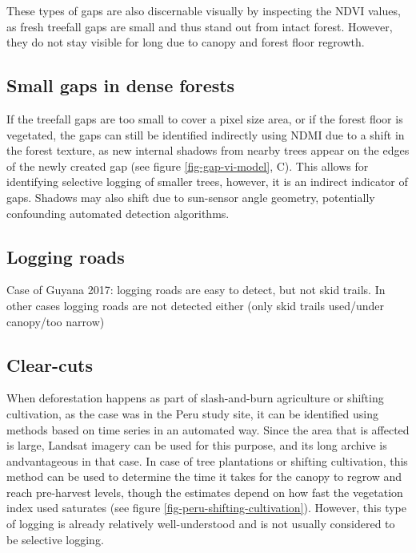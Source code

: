 \documentclass[a4paper,12pt]{scrbook}
\begin{document}
These types of gaps are also discernable visually by inspecting the \ac{NDVI} values, as fresh treefall gaps are small and thus stand out from intact forest. However, they do not stay visible for long due to canopy and forest floor regrowth.

\subsection{Small gaps in dense forests}


If the treefall gaps are too small to cover a pixel size area, or if the forest floor is vegetated, the gaps can still be identified indirectly using \ac{NDMI} due to a shift in the forest texture, as new internal shadows from nearby trees appear on the edges of the newly created gap (see figure \ref{fig-gap-vi-model}, C). This allows for identifying selective logging of smaller trees, however, it is an indirect indicator of gaps. Shadows may also shift due to sun-sensor angle geometry, potentially confounding automated detection algorithms.

\subsection{Logging roads}

Case of Guyana 2017: logging roads are easy to detect, but not skid trails. In other cases logging roads are not detected either (only skid trails used/under canopy/too narrow)

\subsection{Clear-cuts}


When deforestation happens as part of slash-and-burn agriculture or shifting cultivation, as the case was in the Peru study site, it can be identified using methods based on time series in an automated way. Since the area that is affected is large, Landsat imagery can be used for this purpose, and its long archive is andvantageous in that case. In case of tree plantations or shifting cultivation, this method can be used to determine the time it takes for the canopy to regrow and reach pre-harvest levels, though the estimates depend on how fast the vegetation index used saturates (see figure \ref{fig-peru-shifting-cultivation}). However, this type of logging is already relatively well-understood and is not usually considered to be selective logging.
\end{document}

